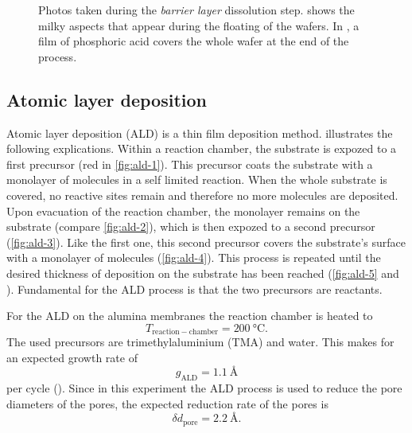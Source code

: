 \documentclass[../thesis.tex]{subfiles}
\begin{document}
\begin{figure}[p]
{            \label{fig:filmed-membrane-photo}}
            \caption{Photos taken during the \textit{barrier layer} dissolution step. \protect{} shows the milky aspects that appear during the floating of the wafers. In \protect{}, a film of phosphoric acid covers the whole wafer at the end of the process.}
            \label{fig:barrier-layer-dissolution-photos}
          \end{figure}

      \subsection{Atomic layer deposition}
      \label{subsec:ald}

        

        Atomic layer deposition (ALD) is a thin film deposition method.  illustrates the following explications. Within a reaction chamber, the substrate is expozed to a first precursor (red in \cref{fig:ald-1}). This precursor coats the substrate with a monolayer of molecules in a self limited reaction. When the whole substrate is covered, no reactive sites remain and therefore no more molecules are deposited. Upon evacuation of the reaction chamber, the monolayer remains on the substrate (compare \cref{fig:ald-2}), which is then expozed to a second precursor (\cref{fig:ald-3}). Like the first one, this second precursor covers the substrate's surface with a monolayer of molecules (\cref{fig:ald-4}). This process is repeated until the desired thickness of deposition on the substrate has been reached (\cref{fig:ald-5} and \protect{}). Fundamental for the ALD process is that the two precursors are reactants.
        \medskip

        For the ALD on the alumina membranes the reaction chamber is heated to
        \begin{equation*}
          T_\mathrm{reaction-chamber}=\SI{200}{\celsius}.
        \end{equation*}
        The used precursors are trimethylaluminium (TMA) and water. This makes for an expected growth rate of
        \begin{equation*}
          g_\mathrm{ALD}=\SI{1,1}{\angstrom}
        \end{equation*}
        per cycle (\cite{SalPoi:ALD}). Since in this experiment the ALD process is used to reduce the pore diameters of the pores, the expected reduction rate of the pores is
        \begin{equation*}
          \delta d_\mathrm{pore}=\SI{2,2}{\angstrom}.
        \end{equation*}
\end{document}
